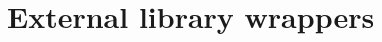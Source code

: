 \hypertarget{group__lavc__codec__wrappers}{}\section{External library wrappers}
\label{group__lavc__codec__wrappers}
